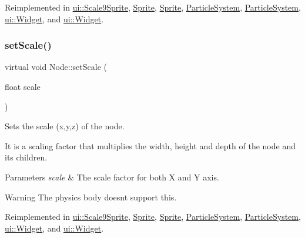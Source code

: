 Reimplemented in \hyperlink{classui_1_1Scale9Sprite_a6824394dc8d5f26668b5e6f8b3cae3ba}{ui\+::\+Scale9\+Sprite}, \hyperlink{classSprite_a5a48d940455148277f65a3f6c68f5442}{Sprite}, \hyperlink{classSprite_a91251019ce74f40cc8d0f04a1dbf70c1}{Sprite}, \hyperlink{classParticleSystem_a9bf57aacb9df62eb5e836c2504904678}{Particle\+System}, \hyperlink{classParticleSystem_ad53bd7f8621c6ea670a5c63866d7b682}{Particle\+System}, \hyperlink{classui_1_1Widget_aa614e1883fa58c0c7fefaa71d9055fd5}{ui\+::\+Widget}, and \hyperlink{classui_1_1Widget_a811bffaa1d3bae377c00a15edccb396f}{ui\+::\+Widget}.

\mbox{\label{classNode_a666da31a8bf7f106409ea8aef707f215}} 
\subsubsection{\texorpdfstring{set\+Scale()}{setScale()}\hspace{0.1cm}{\footnotesize\ttfamily [2/4]}}
{\footnotesize\ttfamily virtual void Node\+::set\+Scale (\begin{DoxyParamCaption}\item[{float}]{scale }\end{DoxyParamCaption})\hspace{0.3cm}{\ttfamily [virtual]}}

Sets the scale (x,y,z) of the node.

It is a scaling factor that multiplies the width, height and depth of the node and its children.


\begin{DoxyParams}{Parameters}
{\em scale} & The scale factor for both X and Y axis.\\
\hline
\end{DoxyParams}
\begin{DoxyWarning}{Warning}
The physics body doesn\textquotesingle{}t support this. 
\end{DoxyWarning}


Reimplemented in \hyperlink{classui_1_1Scale9Sprite_a6824394dc8d5f26668b5e6f8b3cae3ba}{ui\+::\+Scale9\+Sprite}, \hyperlink{classSprite_a5a48d940455148277f65a3f6c68f5442}{Sprite}, \hyperlink{classSprite_a91251019ce74f40cc8d0f04a1dbf70c1}{Sprite}, \hyperlink{classParticleSystem_a9bf57aacb9df62eb5e836c2504904678}{Particle\+System}, \hyperlink{classParticleSystem_ad53bd7f8621c6ea670a5c63866d7b682}{Particle\+System}, \hyperlink{classui_1_1Widget_aa614e1883fa58c0c7fefaa71d9055fd5}{ui\+::\+Widget}, and \hyperlink{classui_1_1Widget_a811bffaa1d3bae377c00a15edccb396f}{ui\+::\+Widget}.


